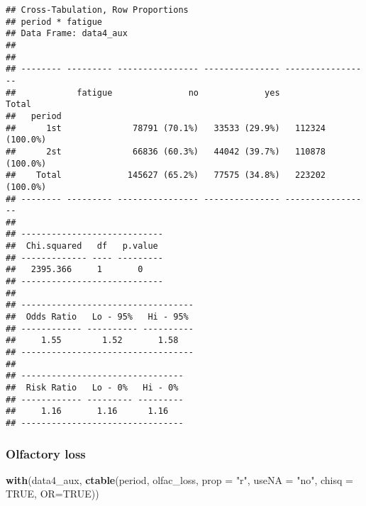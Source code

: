 \documentclass[
]{article}
\newenvironment{Shaded}{\begin{snugshade}}{\end{snugshade}}
\newcommand{\DataTypeTok}[1]{\textcolor[rgb]{0.13,0.29,0.53}{#1}}
\newcommand{\KeywordTok}[1]{\textcolor[rgb]{0.13,0.29,0.53}{\textbf{#1}}}
\newcommand{\NormalTok}[1]{#1}
\newcommand{\OtherTok}[1]{\textcolor[rgb]{0.56,0.35,0.01}{#1}}
\newcommand{\StringTok}[1]{\textcolor[rgb]{0.31,0.60,0.02}{#1}}
\begin{document}
\begin{verbatim}
## Cross-Tabulation, Row Proportions  
## period * fatigue  
## Data Frame: data4_aux  
## 
## 
## -------- --------- ---------------- --------------- -----------------
##            fatigue               no             yes             Total
##   period                                                             
##      1st              78791 (70.1%)   33533 (29.9%)   112324 (100.0%)
##      2st              66836 (60.3%)   44042 (39.7%)   110878 (100.0%)
##    Total             145627 (65.2%)   77575 (34.8%)   223202 (100.0%)
## -------- --------- ---------------- --------------- -----------------
## 
## ----------------------------
##  Chi.squared   df   p.value 
## ------------- ---- ---------
##   2395.366     1       0    
## ----------------------------
## 
## ----------------------------------
##  Odds Ratio   Lo - 95%   Hi - 95% 
## ------------ ---------- ----------
##     1.55        1.52       1.58   
## ----------------------------------
## 
## --------------------------------
##  Risk Ratio   Lo - 0%   Hi - 0% 
## ------------ --------- ---------
##     1.16       1.16      1.16   
## --------------------------------
\end{verbatim}

\hypertarget{olfactory-loss}{%
\subsubsection{Olfactory loss}\label{olfactory-loss}}

\begin{Shaded}
\begin{Highlighting}[]
\KeywordTok{with}\NormalTok{(data4_aux, }\KeywordTok{ctable}\NormalTok{(period, olfac_loss, }\DataTypeTok{prop =} \StringTok{"r"}\NormalTok{, }\DataTypeTok{useNA =} \StringTok{"no"}\NormalTok{, }\DataTypeTok{chisq =} \OtherTok{TRUE}\NormalTok{, }\DataTypeTok{OR=}\OtherTok{TRUE}\NormalTok{))}
\end{Highlighting}
\end{Shaded}
\end{document}
